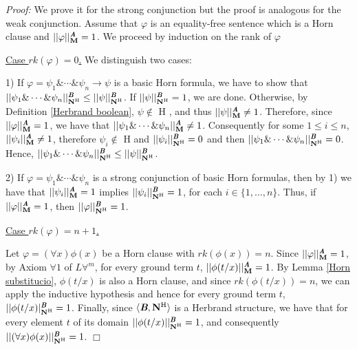 \documentclass{IOS-Book-Article}
\newenvironment{proof}{ \noindent \textit{Proof:} }
{\hfill$\Box$\endtrivlist}
\begin{document}
{\begin{proof} We prove it for the strong conjunction but the proof is analogous for the weak conjunction. Assume that $\varphi$ is an equality-free sentence which is a Horn clause and $||\varphi||^{\emph{\textbf{A}}}_{\textbf{M}}=1$. We proceed by induction on the rank of $\varphi$ 

\bigskip

\underline{Case $rk(\varphi)=0$.} We distinguish two cases: 

\bigskip

1) If $\varphi=\psi_1\&\dotsb\&\psi_n\rightarrow\psi$ is a basic Horn formula, we have to show that $||\psi_1\&\dotsb\&\psi_n||^{\emph{\textbf{B}}}_{\textbf{N}^{\text{H}}} \leq ||\psi||^{\emph{\textbf{B}}}_{\textbf{N}^{\text{H}}}$. If $||\psi||^{\emph{\textbf{B}}}_{\textbf{N}^{\text{H}}}=1$, we are done. Otherwise, by Definition \ref{Herbrand boolean}, $\psi\not \in$ H , and thus $||\psi||^{\emph{\textbf{A}}}_{\textbf{M}}\not = 1$. Therefore, since $||\varphi||^{\emph{\textbf{A}}}_{\textbf{M}}=1$, we have that $||\psi_1\&\dotsb\&\psi_n||^{\emph{\textbf{A}}}_{\textbf{M}}\not = 1$. Consequently for some $1 \leq i \leq n$, $||\psi_i||^{\emph{\textbf{A}}}_{\textbf{M}}\not = 1$, therefore $\psi_i\not \in$ H and $||\psi_i||^{\emph{\textbf{B}}}_{\textbf{N}^{\text{H}}} =0$ and then $||\psi_1\&\dotsb\&\psi_n||^{\emph{\textbf{B}}}_{\textbf{N}^{\text{H}}} =0$. Hence, $||\psi_1\&\dotsb\&\psi_n||^{\emph{\textbf{B}}}_{\textbf{N}^{\text{H}}} \leq ||\psi||^{\emph{\textbf{B}}}_{\textbf{N}^{\text{H}}}$.

\medskip

2)  If $\varphi=\psi_1\&\dotsb\&\psi_n$ is a strong conjunction of basic Horn formulas, then by 1) we have that $||\psi_i||^{\emph{\textbf{A}}}_{\textbf{M}}=1$ implies $||\psi_i||^{\emph{\textbf{B}}}_{\textbf{N}^{\text{H}}}=1$, for each $i\in\{1,\ldots,n\}$. Thus,  if $||\varphi||^{\emph{\textbf{A}}}_{\textbf{M}}=1$, then $||\varphi||^{\emph{\textbf{B}}}_{\textbf{N}^{\text{H}}}=1$.  

\bigskip


\underline{Case $rk(\varphi)=n+1$.} 


\bigskip

Let $\varphi=(\forall x)\phi(x)$ be a Horn clause with $rk(\phi(x))=n$. Since $||\varphi||^{\emph{\textbf{A}}}_{\textbf{M}}=1$, by Axiom \emph{$\forall 1$} of $L\forall^m$, for every ground term $t$, $||\phi(t/x)||^{\emph{\textbf{A}}}_{\textbf{M}}=1$.  By Lemma \ref{Horn substitucio}, $\phi(t/x)$ is also a Horn clause, and since $rk(\phi(t/x))=n$, we can apply the inductive hypothesis and hence for every ground term $t$, $||\phi(t/x)|^{\emph{\textbf{B}}}_{\textbf{N}^{\text{H}}}=1$. Finally, since $\langle\emph{\textbf{B}},\mathbf{N}^{\text{H}}\rangle$ is a Herbrand structure, we have that for every element $t$ of its domain $||\phi(t/x)||^{\emph{\textbf{B}}}_{\textbf{N}^{\text{H}}}=1$, and consequently $||(\forall x)\phi(x)||^{\emph{\textbf{B}}}_{\textbf{N}^{\text{H}}}=1$. \end{proof}

}
\end{document}

